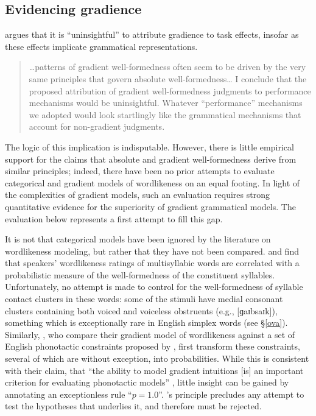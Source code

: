 \subsection{Evidencing gradience}

\citet{Hayes2000} argues that it is ``uninsightful'' to attribute gradience to task effects, insofar as these effects implicate grammatical representations. 


\begin{quote}
\ldots{}patterns of gradient well-formedness often seem to be driven by the very same principles that govern absolute well-formedness\ldots{} I conclude that the proposed attribution of gradient well-formedness judgments to performance mechanisms would be uninsightful. Whatever ``performance'' mechanisms we adopted would look startlingly like the grammatical mechanisms that account for non-gradient judgments. \citep[99]{Hayes2000}
\end{quote}

\noindent
The logic of this implication is indisputable.
However, there is little empirical support for the claims that absolute and gradient well-formedness derive from similar principles; indeed, there have been no prior attempts to evaluate categorical and gradient models of wordlikeness on an equal footing.
In light of the complexities of gradient models, such an evaluation requires strong quantitative evidence for the superiority of gradient grammatical models.
The evaluation below represents a first attempt to fill this gap.

It is not that categorical models have been ignored by the literature on wordlikeness modeling, but rather that they have not been compared.
\citet{Frisch2000} and \citet{Vitevitch1997} find that speakers' wordlikeness ratings of multisyllabic words are correlated with a probabilistic measure of the well-formedness of the constituent syllables. 
Unfortunately, no attempt is made to control for the well-formedness of syllable contact clusters in these words: some of the stimuli have medial consonant clusters containing both voiced and voiceless obstruents (e.g., [ɡaɪbsaɪk]), something which is exceptionally rare in English simplex words
(see \S\ref{ova}). %
Similarly, \citet{Hayes2008a}, who compare their gradient model of wordlikeness against a set of English phonotactic constraints proposed by \citet{Clements1983}, first transform these constraints, several of which are without exception, into probabilities.
While this is consistent with their claim, that ``the ability to model gradient intuitions [is] an important criterion for evaluating phonotactic models'' \citep[382]{Hayes2008a}, little insight can be gained by annotating an exceptionless rule ``$p = 1.0$''. 
\citeauthor{Hayes2008a}'s principle precludes any attempt to test the hypotheses that underlies it, and therefore must be rejected.

